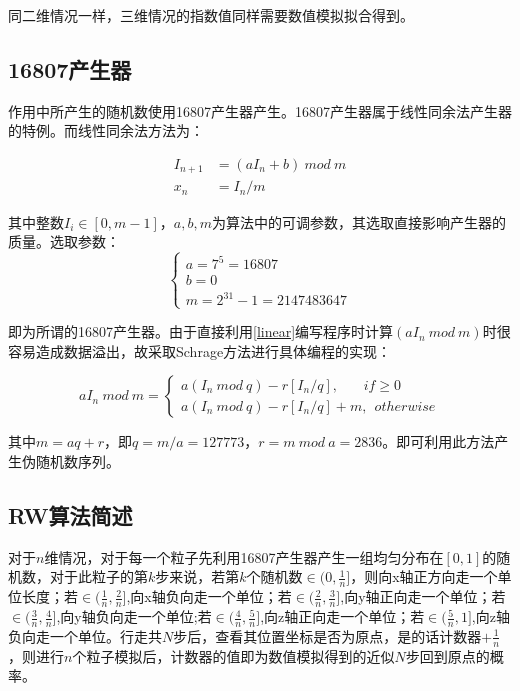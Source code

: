 \documentclass[a4paper,11pt]{article}
\begin{document}
同二维情况一样，三维情况的指数值同样需要数值模拟拟合得到。

\subsection{16807产生器}
作用中所产生的随机数使用16807产生器产生。16807产生器属于线性同余法产生器的特例。而线性同余法方法为：

\begin{equation}
\begin{aligned}
	I_{n+1} &= (aI_{n} + b) \ mod \ m \\
	x_{n} &= I_{n}/m
\end{aligned}
\label{linear}	
\end{equation}

其中整数$I_{i} \in [0,m-1]$，$a,b,m$为算法中的可调参数，其选取直接影响产生器的质量。选取参数：
\begin{equation}
\left\{
\begin{array}{l}
	a = 7^{5} = 16807 \\
	b = 0 \\
	m = 2^{31}-1 = 2147483647
\end{array}
\right.
\end{equation}

即为所谓的16807产生器。由于直接利用\ref{linear}编写程序时计算$(aI_{n} \ mod \ m )$时很容易造成数据溢出，故采取Schrage方法进行具体编程的实现：

\begin{equation}
	aI_{n} \ mod \ m = \left\{
	\begin{array}{l}
		a(I_{n}\ mod \ q) - r[I_{n}/q],\ \ \ \ \ \ \ \ if \geq 0 \\
		a(I_{n}\ mod \ q) - r[I_{n}/q] + m,\ \ otherwise	
			\end{array}
	\right.
\end{equation}

其中$m=aq+r$，即$q=m/a=127773$，$r=m \ mod \ a=2836$。即可利用此方法产生伪随机数序列。
\subsection{RW算法简述}

对于$n$维情况，对于每一个粒子先利用16807产生器产生一组均匀分布在$[0,1]$的随机数，对于此粒子的第$k$步来说，若第$k$个随机数$\in (0,\frac{1}{n}]$，则向x轴正方向走一个单位长度；若$\in (\frac{1}{n},\frac{2}{n}]$,向x轴负向走一个单位；若$\in (\frac{2}{n},\frac{3}{n}]$,向y轴正向走一个单位；若$\in (\frac{3}{n},\frac{4}{n}]$,向y轴负向走一个单位;若$\in (\frac{4}{n},\frac{5}{n}]$,向z轴正向走一个单位；若$\in (\frac{5}{n},1]$,向z轴负向走一个单位。行走共$N$步后，查看其位置坐标是否为原点，是的话计数器$+\frac{1}{n}$，则进行$n$个粒子模拟后，计数器的值即为数值模拟得到的近似$N$步回到原点的概率。
\end{document}
